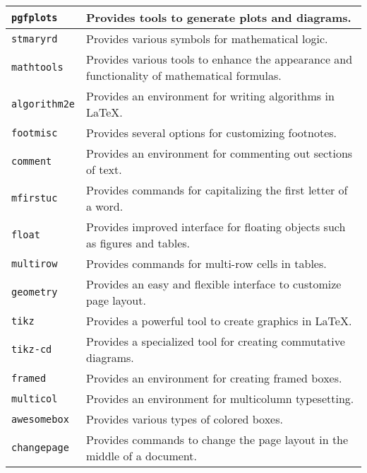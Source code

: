 \begin{tabularx}{\linewidth}{|X|X|}
    \hline
    \verb|pgfplots|         & Provides tools to generate plots and diagrams.                                                                         \\
    \hline
    \verb|stmaryrd|         & Provides various symbols for mathematical logic.                                                                       \\
    \hline
    \verb|mathtools|        & Provides various tools to enhance the appearance and functionality of mathematical formulas.                           \\
    \hline
    \verb|algorithm2e|      & Provides an environment for writing algorithms in LaTeX.                                                               \\
    \hline
    \verb|footmisc|         & Provides several options for customizing footnotes.                                                                    \\
    \hline
    \verb|comment|          & Provides an environment for commenting out sections of text.                                                           \\
    \hline
    \verb|mfirstuc|         & Provides commands for capitalizing the first letter of a word.                                                         \\
    \hline
    \verb|float|            & Provides improved interface for floating objects such as figures and tables.                                           \\
    \hline
    \verb|multirow|         & Provides commands for multi-row cells in tables.                                                                       \\
    \hline
    \verb|geometry|         & Provides an easy and flexible interface to customize page layout.                                                      \\
    \hline
    \verb|tikz|             & Provides a powerful tool to create graphics in LaTeX.                                                                  \\
    \hline
    \verb|tikz-cd|          & Provides a specialized tool for creating commutative diagrams.                                                         \\
    \hline
    \verb|framed|           & Provides an environment for creating framed boxes.                                                                     \\
    \hline
    \verb|multicol|         & Provides an environment for multicolumn typesetting.                                                                   \\
    \hline
    \verb|awesomebox|       & Provides various types of colored boxes.                                                                               \\
    \hline
    \verb|changepage|       & Provides commands to change the page layout in the middle of a document.                                               \\
    \hline
\end{tabularx}